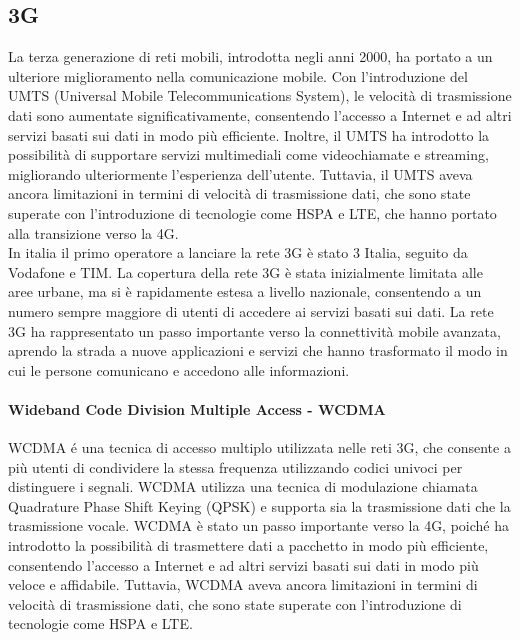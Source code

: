 \subsection{3G}
La terza generazione di reti mobili, introdotta negli anni 2000, ha portato a un ulteriore miglioramento nella comunicazione mobile. Con l'introduzione del UMTS (Universal Mobile Telecommunications System), le velocità di trasmissione dati sono aumentate significativamente, consentendo l'accesso a Internet e ad altri servizi basati sui dati in modo più efficiente. Inoltre, il UMTS ha introdotto la possibilità di supportare servizi multimediali come videochiamate e streaming, migliorando ulteriormente l'esperienza dell'utente. Tuttavia, il UMTS aveva ancora limitazioni in termini di velocità di trasmissione dati, che sono state superate con l'introduzione di tecnologie come HSPA e LTE, che hanno portato alla transizione verso la 4G.\\
In italia il primo operatore a lanciare la rete 3G è stato 3 Italia, seguito da Vodafone e TIM. La copertura della rete 3G è stata inizialmente limitata alle aree urbane, ma si è rapidamente estesa a livello nazionale, consentendo a un numero sempre maggiore di utenti di accedere ai servizi basati sui dati. La rete 3G ha rappresentato un passo importante verso la connettività mobile avanzata, aprendo la strada a nuove applicazioni e servizi che hanno trasformato il modo in cui le persone comunicano e accedono alle informazioni.\\
\paragraph{Wideband Code Division Multiple Access - WCDMA}
WCDMA é una tecnica di accesso multiplo utilizzata nelle reti 3G, che consente a più utenti di condividere la stessa frequenza utilizzando codici univoci per distinguere i segnali. WCDMA utilizza una tecnica di modulazione chiamata Quadrature Phase Shift Keying (QPSK) e supporta sia la trasmissione dati che la trasmissione vocale. WCDMA è stato un passo importante verso la 4G, poiché ha introdotto la possibilità di trasmettere dati a pacchetto in modo più efficiente, consentendo l'accesso a Internet e ad altri servizi basati sui dati in modo più veloce e affidabile. Tuttavia, WCDMA aveva ancora limitazioni in termini di velocità di trasmissione dati, che sono state superate con l'introduzione di tecnologie come HSPA e LTE.\\

